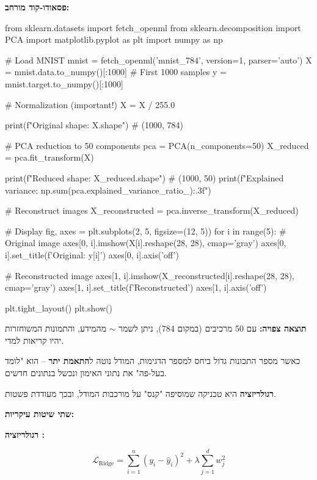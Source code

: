\textbf{פסאודו-קוד מורחב:}

\begin{pythonbox}
from sklearn.datasets import fetch_openml
from sklearn.decomposition import PCA
import matplotlib.pyplot as plt
import numpy as np

# Load MNIST
mnist = fetch_openml('mnist_784', version=1, parser='auto')
X = mnist.data.to_numpy()[:1000]  # First 1000 samples
y = mnist.target.to_numpy()[:1000]

# Normalization (important!)
X = X / 255.0

print(f"Original shape: {X.shape}")  # (1000, 784)

# PCA reduction to 50 components
pca = PCA(n_components=50)
X_reduced = pca.fit_transform(X)

print(f"Reduced shape: {X_reduced.shape}")  # (1000, 50)
print(f"Explained variance: {np.sum(pca.explained_variance_ratio_):.3f}")

# Reconstruct images
X_reconstructed = pca.inverse_transform(X_reduced)

# Display
fig, axes = plt.subplots(2, 5, figsize=(12, 5))
for i in range(5):
    # Original image
    axes[0, i].imshow(X[i].reshape(28, 28), cmap='gray')
    axes[0, i].set_title(f'Original: {y[i]}')
    axes[0, i].axis('off')

    # Reconstructed image
    axes[1, i].imshow(X_reconstructed[i].reshape(28, 28), cmap='gray')
    axes[1, i].set_title(f'Reconstructed')
    axes[1, i].axis('off')

plt.tight_layout()
plt.show()
\end{pythonbox}

\textbf{תוצאה צפויה:} עם \num{50} מרכיבים (במקום \num{784}), ניתן לשמר $\sim$ מהמידע, והתמונות המשוחזרות יהיו קריאות למדי.


כאשר מספר התכונות גדול ביחס למספר הדגימות, המודל נוטה ל\textbf{התאמת יתר}  – הוא "לומד בעל-פה" את נתוני האימון ונכשל בנתונים חדשים.

\textbf{רגולריזציה}  היא טכניקה שמוסיפה "קנס" על מורכבות המודל, ובכך מעודדת פשטות.

\textbf{שתי שיטות עיקריות:}

\textbf{רגולריזציה :}

\begin{equation}
\mathcal{L}_{\text{Ridge}} = \sum_{i=1}^{n} (y_i - \hat{y}_i)^2 + \lambda \sum_{j=1}^{d} w_j^2
\end{equation}

